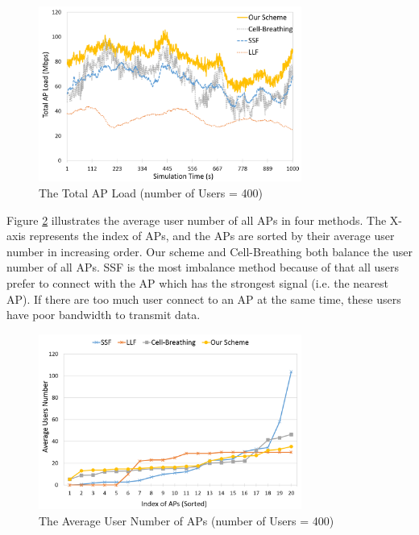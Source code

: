 \begin{figure}[tbp]
\begin{center}
\includegraphics[width=3.4in]{images/Total_AP_load.png}
\end{center}
\caption{The Total AP Load (number of Users = 400)}
\label{fig:Total-AP-load}
\end{figure}

Figure \ref{fig:Average-user-number} illustrates the average user number of all APs in four methods. The X-axis represents the index of APs, and the APs are sorted by their average user number in increasing order. Our scheme and Cell-Breathing both balance the user number of all APs. SSF is the most imbalance method because of that all users prefer to connect with the AP which has the strongest signal (i.e. the nearest AP). If there are too much user connect to an AP at the same time, these users have poor bandwidth to transmit data.

\begin{figure}[tbp]
\begin{center}
\includegraphics[width=3.4in]{images/Average_user_number.png}
\end{center}
\caption{The Average User Number of APs (number of Users = 400)}
\label{fig:Average-user-number}
\end{figure}

